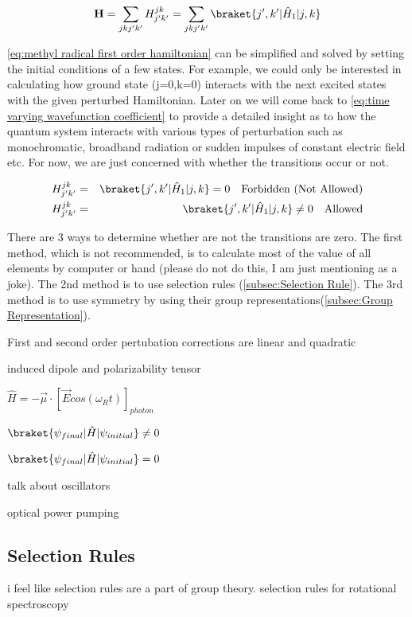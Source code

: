 \documentclass[11pt,a4paper]{book}
\begin{document}
			\begin{equation}
				\label{eq:methyl radical first order hamiltonian}
				\textbf{H} = \sum_{jkj'k'} H_{j'k'}^{jk} = \sum_{jkj'k'}\braket{j',k'| \hat{H}_1 |j, k}
			\end{equation}
			
			\noindent
			\autoref{eq:methyl radical first order hamiltonian} can be simplified and solved by setting the initial conditions of a few states. For example, we could only be interested in calculating how ground state (j=0,k=0) interacts with the next excited states with the given perturbed Hamiltonian. Later on we will come back to \autoref{eq:time varying wavefunction coefficient} to provide a detailed insight as to how the quantum system interacts with various types of perturbation such as monochromatic, broadband radiation or sudden impulses of constant electric field etc. For now, we are just concerned with whether the transitions occur or not.
			
			\begin{eqnarray*}
				H_{j'k'}^{jk} & = & \braket{j', k'| \hat{H}_1 |j, k} = 0 \quad \text{Forbidden (Not Allowed)}\\
				H_{j'k'}^{jk} & = & \braket{j', k'| \hat{H}_1 |j, k} \neq 0 \quad \text{Allowed}
			\end{eqnarray*}
			
			There are 3 ways to determine whether are not the transitions are zero. The first method, which is not recommended, is to calculate most of the value of all elements by computer or hand (please do not do this, I am just mentioning as a joke). The 2nd method is to use selection rules (\autoref{subsec:Selection Rule}). The 3rd method is to use symmetry by using their group representations(\autoref{subsec:Group Representation}).
			
			First and second order pertubation corrections are linear and quadratic
			
			induced dipole and polarizability tensor
			
			$\hat{H} = -\vec{\mu} \cdot [\vec{E}cos(\omega_R t)]_{photon}$
			
			$\braket{\psi_{final} |\hat{H} |\psi_{initial}} \neq 0$
			
			$\braket{\psi_{final} |\hat{H} |\psi_{initial}} = 0$
			
			talk about oscillators 
			
			optical power pumping
		\subsection{Selection Rules}
			\label{subsec:Selection Rule}
			i feel like selection rules are a part of group theory.
			selection rules for rotational spectroscopy
			
\end{document}
